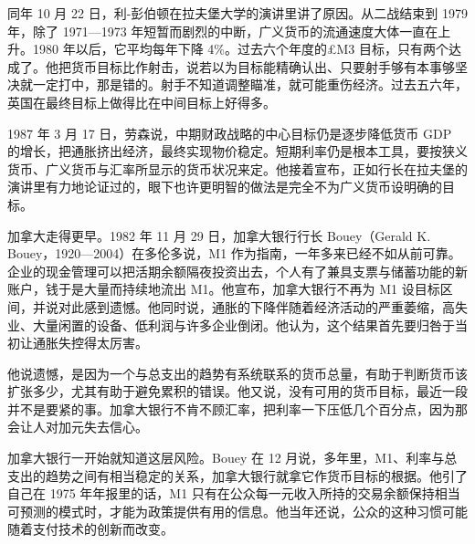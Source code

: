 同年 10 月 22 日，利-彭伯顿在拉夫堡大学的演讲里讲了原因\cite{leighpemberton1986}。从二战结束到 1979 年，除了 1971—1973 年短暂而剧烈的中断，广义货币的流通速度大体一直在上升\cite{leighpemberton1986}。1980 年以后，它平均每年下降 4\%\cite{leighpemberton1986}。过去六个年度的£M3 目标，只有两个达成了\cite{leighpemberton1986}。他把货币目标比作射击，说若以为目标能精确认出、只要射手够有本事够坚决就一定打中，那是错的\cite{leighpemberton1986}。射手不知道调整瞄准，就可能重伤经济\cite{leighpemberton1986}。过去五六年，英国在最终目标上做得比在中间目标上好得多\cite{leighpemberton1986}。

1987 年 3 月 17 日，劳森说，中期财政战略的中心目标仍是逐步降低货币 GDP 的增长，把通胀挤出经济，最终实现物价稳定\cite{hansard1987}。短期利率仍是根本工具，要按狭义货币、广义货币与汇率所显示的货币状况来定\cite{hansard1987}。他接着宣布，正如行长在拉夫堡的演讲里有力地论证过的，眼下也许更明智的做法是完全不为广义货币设明确的目标\cite{hansard1987}。

加拿大走得更早。1982 年 11 月 29 日，加拿大银行行长 Bouey（Gerald K. Bouey，1920—2004）在多伦多说，M1 作为指南，一年多来已经不如从前可靠\cite{bouey1982a,loc45}。企业的现金管理可以把活期余额隔夜投资出去，个人有了兼具支票与储蓄功能的新账户，钱于是大量而持续地流出 M1\cite{bouey1982a}。他宣布，加拿大银行不再为 M1 设目标区间，并说对此感到遗憾\cite{bouey1982a}。他同时说，通胀的下降伴随着经济活动的严重萎缩，高失业、大量闲置的设备、低利润与许多企业倒闭\cite{bouey1982a}。他认为，这个结果首先要归咎于当初让通胀失控得太厉害\cite{bouey1982a}。

他说遗憾，是因为一个与总支出的趋势有系统联系的货币总量，有助于判断货币该扩张多少，尤其有助于避免累积的错误\cite{bouey1982a}。他又说，没有可用的货币目标，最近一段并不是要紧的事\cite{bouey1982a}。加拿大银行不肯不顾汇率，把利率一下压低几个百分点，因为那会让人对加元失去信心\cite{bouey1982a}。

加拿大银行一开始就知道这层风险。Bouey 在 12 月说，多年里，M1、利率与总支出的趋势之间有相当稳定的关系，加拿大银行就拿它作货币目标的根据\cite{bouey1982b}。他引了自己在 1975 年年报里的话，M1 只有在公众每一元收入所持的交易余额保持相当可预测的模式时，才能为政策提供有用的信息\cite{bouey1982b}。他当年还说，公众的这种习惯可能随着支付技术的创新而改变\cite{bouey1982b}。

